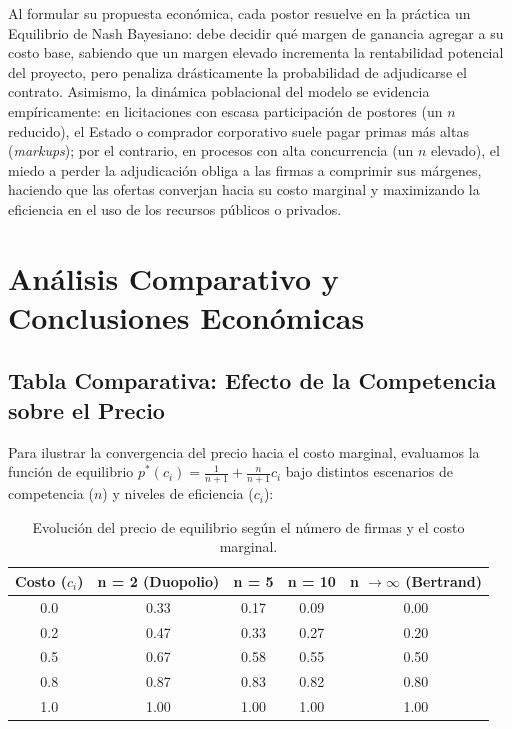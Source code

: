 \documentclass[12pt]{article}
\begin{document}
Al formular su propuesta económica, cada postor resuelve en la práctica un Equilibrio de Nash Bayesiano: debe decidir qué margen de ganancia agregar a su costo base, sabiendo que un margen elevado incrementa la rentabilidad potencial del proyecto, pero penaliza drásticamente la probabilidad de adjudicarse el contrato. Asimismo, la dinámica poblacional del modelo se evidencia empíricamente: en licitaciones con escasa participación de postores (un $n$ reducido), el Estado o comprador corporativo suele pagar primas más altas (\textit{markups}); por el contrario, en procesos con alta concurrencia (un $n$ elevado), el miedo a perder la adjudicación obliga a las firmas a comprimir sus márgenes, haciendo que las ofertas converjan hacia su costo marginal y maximizando la eficiencia en el uso de los recursos públicos o privados.

\section{Análisis Comparativo y Conclusiones Económicas}

\subsection{Tabla Comparativa: Efecto de la Competencia sobre el Precio}

Para ilustrar la convergencia del precio hacia el costo marginal, evaluamos la función de equilibrio $p^*(c_i) = \frac{1}{n+1} + \frac{n}{n+1}c_i$ bajo distintos escenarios de competencia ($n$) y niveles de eficiencia ($c_i$):

\begin{table}[h]
\centering
\begin{tabular}{|c|c|c|c|c|}
\hline
\textbf{Costo ($c_i$)} & \textbf{n = 2} (Duopolio) & \textbf{n = 5} & \textbf{n = 10} & \textbf{n $\to \infty$} (Bertrand) \\ \hline
0.0 & 0.33 & 0.17 & 0.09 & 0.00 \\ \hline
0.2 & 0.47 & 0.33 & 0.27 & 0.20 \\ \hline
0.5 & 0.67 & 0.58 & 0.55 & 0.50 \\ \hline
0.8 & 0.87 & 0.83 & 0.82 & 0.80 \\ \hline
1.0 & 1.00 & 1.00 & 1.00 & 1.00 \\ \hline

\end{tabular}


\caption{Evolución del precio de equilibrio según el número de firmas y el costo marginal.}
\end{table}
\end{document}
